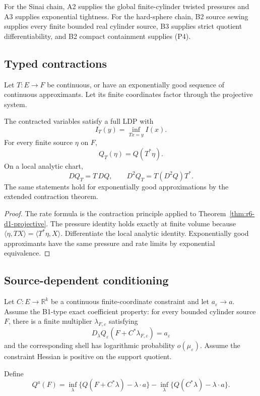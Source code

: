 For the Sinai chain, A2 supplies the global finite-cylinder twisted pressures
and A3 supplies exponential tightness.  For the hard-sphere chain, B2 source
sewing supplies every finite bounded real cylinder source, B3 supplies strict
quotient differentiability, and B2 compact containment supplies (P4).

\subsection{Typed contractions}

Let \(T:E\to F\) be continuous, or have an exponentially good sequence of
continuous approximants.  Let its finite coordinates factor through the
projective system.

\begin{theorem}
\label{thm:r6-d1-contraction}
The contracted variables satisfy a full LDP with
\[
I_T(y)=\inf_{Tx=y}I(x).
\]
For every finite source \(\eta\) on \(F\),
\[
Q_T(\eta)=Q(T^*\eta).
\]
On a local analytic chart,
\[
DQ_T=T\,DQ,
\qquad
D^2Q_T=T(D^2Q)T^*.
\]
The same statements hold for exponentially good approximations by the
extended contraction theorem.
\end{theorem}

\begin{proof}
The rate formula is the contraction principle applied to
Theorem~\ref{thm:r6-d1-projective}.  The pressure identity holds exactly at
finite volume because
\(\langle\eta,TX\rangle=\langle T^*\eta,X\rangle\).  Differentiate the local
analytic identity.  Exponentially good approximants have the same pressure and
rate limits by exponential equivalence.
\end{proof}

\subsection{Source-dependent conditioning}

Let \(C:E\to\mathbb R^k\) be a continuous finite-coordinate constraint and
let \(a_\varepsilon\to a\).  Assume the B1-type exact coefficient property:
for every bounded cylinder source \(F\), there is a finite multiplier
\(\lambda_{F,\varepsilon}\) satisfying
\[
D_\lambda Q_\varepsilon(F+C^*\lambda_{F,\varepsilon})=a_\varepsilon
\]
and the corresponding shell has logarithmic probability
\(o(\mu_\varepsilon)\).  Assume the constraint Hessian is positive on the
support quotient.

Define
\[
Q^a(F)=
\inf_\lambda\{Q(F+C^*\lambda)-\lambda\cdot a\}
-\inf_\lambda\{Q(C^*\lambda)-\lambda\cdot a\}.
\]

